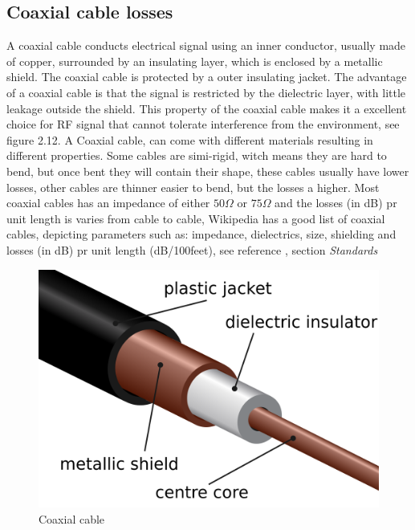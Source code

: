 \subsection{Coaxial cable losses}
A coaxial cable conducts electrical signal using an inner conductor, usually made of copper, surrounded by an insulating layer, which is enclosed by a metallic shield. The coaxial cable is protected by a outer insulating jacket. The advantage of a coaxial cable is that the signal is restricted by the dielectric layer, with little leakage outside the shield. This property of the coaxial cable makes it a excellent choice for RF signal that cannot tolerate interference from the environment\cite{CoaxialCable}, see figure 2.12. A Coaxial cable, can come with different materials resulting in different properties. Some cables are simi-rigid, witch means they are hard to bend, but once bent they will contain their shape, these cables usually have lower losses, other cables are thinner easier to bend, but the losses a higher. Most coaxial cables has an impedance of either $50\Omega$ or $75\Omega$ and the losses (in dB) pr unit length is varies from cable to cable, Wikipedia has a good list of coaxial cables, depicting parameters such as: impedance, dielectrics, size, shielding and losses (in dB) pr unit length (dB/100feet), see reference \cite{CoaxialCable}, section \textit{Standards}

\begin{figure}[h!]
\centering
\includegraphics[scale=0.15]{figures/CoaxialCable.png}
\caption{Coaxial cable\cite{CoaxialCable}}
\end{figure}

